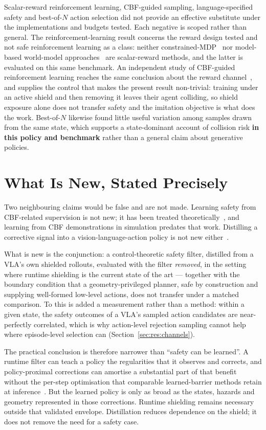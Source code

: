 Scalar-reward reinforcement learning, CBF-guided sampling, language-specified safety and
best-of-$N$ action selection did not provide an effective substitute under the implementations and
budgets tested. Each negative is scoped rather than general. The reinforcement-learning result
concerns the reward design tested and not safe reinforcement learning as a class: neither
constrained-MDP~\cite{safevla} nor model-based world-model approaches~\cite{safedojo} are
scalar-reward methods, and the latter is evaluated on this same benchmark. An independent study of
CBF-guided reinforcement learning reaches the same conclusion about the reward
channel~\cite{guerrier2025guardrails}, and supplies the control that makes the present result
non-trivial: training under an active shield and then removing it leaves their agent colliding, so
shield exposure alone does not transfer safety and the imitation objective is what does the work.
Best-of-$N$ likewise found little useful variation among samples drawn from the same state, which
supports a state-dominant account of collision risk \textbf{in this policy and benchmark} rather
than a general claim about generative policies.

\section*{What Is New, Stated Precisely}

Two neighbouring claims would be false and are not made. Learning safety from CBF-related
supervision is not new; it has been treated theoretically~\cite{cosner2022il_cbf}, and learning
from CBF demonstrations in simulation predates that work. Distilling a corrective signal into a
vision-language-action policy is not new either~\cite{wang2026roadvla}.

What is new is the conjunction: a control-theoretic safety filter, distilled from a VLA's own
shielded rollouts, evaluated with the filter \emph{removed}, in the setting where runtime shielding
is the current state of the art --- together with the boundary condition that a geometry-privileged
planner, safe by construction and supplying well-formed low-level actions, does not transfer under
a matched comparison. To this is added a measurement rather than a method: within a given state,
the safety outcomes of a VLA's sampled action candidates are near-perfectly correlated, which is
why action-level rejection sampling cannot help where episode-level selection can
(Section~\ref{sec:res:channels}).

The practical conclusion is therefore narrower than ``safety can be learned''. A runtime filter can
teach a policy the regularities that it observes and corrects, and policy-proximal corrections can
amortise a substantial part of that benefit without the per-step optimisation that comparable
learned-barrier methods retain at inference~\cite{meng2024conbat,sun2025lpb}. But the learned
policy is only as broad as the states, hazards and geometry represented in those corrections.
Runtime shielding remains necessary outside that validated envelope. Distillation reduces
dependence on the shield; it does not remove the need for a safety case.

